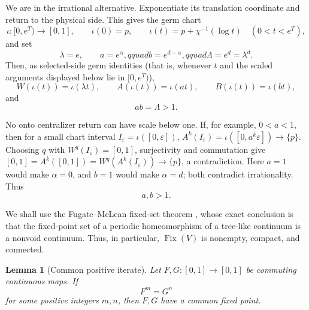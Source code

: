 \documentclass[11pt]{article}
\newtheorem{lemma}[theorem]{Lemma}
\theoremstyle{definition}
\theoremstyle{remark}
\newcommand{\I}{[0,1]}
\newcommand{\Fix}{\operatorname{Fix}}
\begin{document}
We are in the irrational alternative.  Exponentiate its translation
coordinate and return to the physical side.  This gives the germ chart
\[
 \iota:[0,e^T)\longrightarrow\I,\qquad
 \iota(0)=p,\qquad
 \iota(t)=p+\chi^{-1}(\log t)\quad(0<t<e^T),
\]
and set
\[
 \lambda=e,\qquad a=e^\alpha,qquad b=e^{d-\alpha},qquad
 \Lambda=e^d=\lambda^d.
\]
Then, as selected-side germ identities (that is, whenever \(t\) and the
scaled arguments displayed below lie in \([0,e^T)\)),
\begin{equation}\label{eq:actor-dilations}
 W(\iota(t))=\iota(\lambda t),\qquad
 A(\iota(t))=\iota(at),\qquad
 B(\iota(t))=\iota(bt),
\end{equation}
and
\begin{equation}\label{eq:analytic-scale-product}
 ab=\Lambda>1.
\end{equation}

No onto centralizer return can have scale below one.  If, for example,
\(0<a<1\), then for a small chart interval
\(I_\varepsilon=\iota([0,\varepsilon])\),
\(A^k(I_\varepsilon)=\iota([0,a^k\varepsilon])\to\{p\}\).  Choosing \(q\)
with \(W^q(I_\varepsilon)=\I\), surjectivity and commutation give
\(\I=A^k(\I)=W^q(A^k(I_\varepsilon))\to\{p\}\), a contradiction.  Here
\(a=1\) would make \(\alpha=0\), and \(b=1\) would make \(\alpha=d\); both
contradict irrationality.  Thus
\begin{equation}\label{eq:analytic-scales-positive}
 a,b>1.
\end{equation}

We shall use the Fugate--McLean fixed-set theorem
\cite[Corollary 1.5, p.~614]{FugateMcLean}, whose exact conclusion is that
the fixed-point set of a periodic homeomorphism of a tree-like continuum is
a nonvoid continuum.  Thus, in particular, \(\Fix(V)\) is nonempty, compact,
and connected.

\begin{lemma}[Common positive iterate]
\label{lem:analytic-common-iterate}
Let \(F,G\colon\I\to\I\) be commuting continuous maps.  If
\[
 F^m=G^n
\]
for some positive integers \(m,n\), then \(F,G\) have a common fixed point.
\end{lemma}
\end{document}
